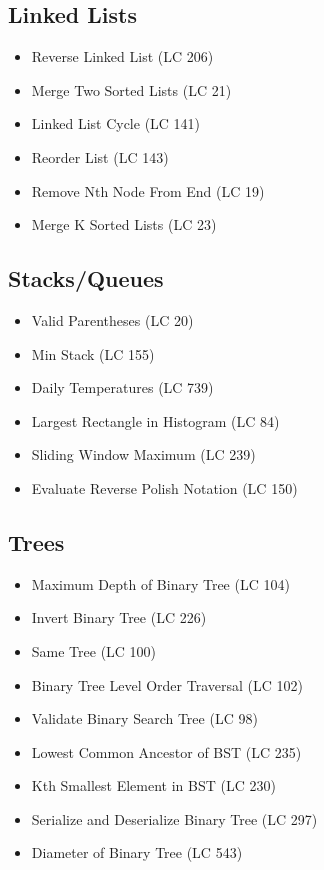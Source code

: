 \documentclass[11pt]{article}
\providecommand{\tightlist}{\setlength{\itemsep}{1pt}\setlength{\parskip}{0pt}}
\begin{document}
\subsection{Linked Lists}\label{linked-lists-1}

\begin{itemize}
\tightlist
\item
  Reverse Linked List (LC 206)
\item
  Merge Two Sorted Lists (LC 21)
\item
  Linked List Cycle (LC 141)
\item
  Reorder List (LC 143)
\item
  Remove Nth Node From End (LC 19)
\item
  Merge K Sorted Lists (LC 23)
\end{itemize}

\subsection{Stacks/Queues}\label{stacksqueues}

\begin{itemize}
\tightlist
\item
  Valid Parentheses (LC 20)
\item
  Min Stack (LC 155)
\item
  Daily Temperatures (LC 739)
\item
  Largest Rectangle in Histogram (LC 84)
\item
  Sliding Window Maximum (LC 239)
\item
  Evaluate Reverse Polish Notation (LC 150)
\end{itemize}

\subsection{Trees}\label{trees-1}

\begin{itemize}
\tightlist
\item
  Maximum Depth of Binary Tree (LC 104)
\item
  Invert Binary Tree (LC 226)
\item
  Same Tree (LC 100)
\item
  Binary Tree Level Order Traversal (LC 102)
\item
  Validate Binary Search Tree (LC 98)
\item
  Lowest Common Ancestor of BST (LC 235)
\item
  Kth Smallest Element in BST (LC 230)
\item
  Serialize and Deserialize Binary Tree (LC 297)
\item
  Diameter of Binary Tree (LC 543)
\end{itemize}
\end{document}
